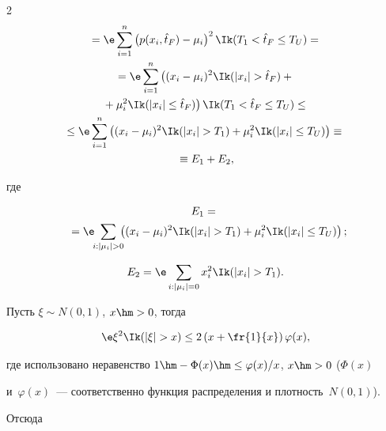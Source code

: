 \begin{multicols}{2}
\begin{multline*}
{}=

\e  \sum\limits_{i=1}^n \left(p(x_i, \hat{t}_F)-\mu_i\right)^2  \Ik(T_1 < \hat{t}_F  

\leq T_U) ={}\\

{}= \e  \sum\limits_{i=1}^n \left((x_i-\mu_i)^2 \Ik(|x_i| >\hat{t}_F) + {}\right.\\

\left.{}+\mu_i^2 

\Ik(|x_i| \leq \hat{t}_F)\right) \Ik(T_1 < \hat{t}_F  \leq T_U) \leq{}\\

\!{}\leq \e  \sum\limits_{i=1}^n \left((x_i-\mu_i)^2 \Ik(|x_i| >T_1) + \mu_i^2 

\Ik(|x_i| \leq T_U)\right) \equiv{}\\

{}\equiv E_1+E_2,

\end{multline*}

где

\begin{multline*}

E_1 ={}\\

\!{}= \e \!\! \sum\limits_{i : |\mu_i| > 0}\!\!\! \left((x_i-\mu_i)^2 \Ik(|x_i| >T_1) + 

\mu_i^2 \Ik(|x_i| \leq T_U)\right);\hspace*{-6.19644pt}

\end{multline*}

$$

E_2 = \e  \sum\limits_{i : |\mu_i| =0} x_i^2 \Ik(|x_i| >T_1).

$$

Пусть $\xi \sim N(0,1)$, $x\hm>0$, тогда

$$

\e \xi^2 \Ik

(|\xi|>x)  \leq 2\left(x + \fr{1}{x}\right)\varphi(x),

$$

где использовано неравенство $1\hm-\Phi(x)\hm\leq\varphi(x)/x$, $x\hm>0$ ($\Phi(x)$ 

и~$\varphi(x)$~--- соответственно функция распределения и плот\-ность~$N(0,1)$). 

Отсюда



\columnbreak



\noindent


\end{multicols}
